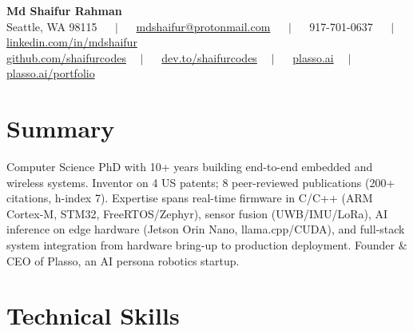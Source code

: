 \documentclass[10.5pt,letterpaper]{article}
\newcommand{\pipe}{$\quad \mid \quad$}
\begin{document}
\begin{center}
  {\LARGE\bfseries Md Shaifur Rahman}\\[4pt]
  Seattle, WA 98115 \pipe{} 
  \href{mailto:mdshaifur@protonmail.com}{mdshaifur@protonmail.com} \pipe{}
  917-701-0637 \pipe{} \href{https://linkedin.com/in/mdshaifur}{linkedin.com/in/mdshaifur}\\[2pt]
  \href{https://github.com/shaifurcodes}{github.com/shaifurcodes}\pipe{} 
  \href{https://dev.to/shaifurcodes}{dev.to/shaifurcodes}\pipe{} 
  \href{https://plasso.ai}{plasso.ai}\pipe{} 
  \href{https://plasso.ai/portfolio}{plasso.ai/portfolio}
\end{center}

\vspace{2pt}

\section{Summary}
Computer Science PhD with 10+ years building end-to-end embedded and wireless systems.
Inventor on 4 US patents; 8 peer-reviewed publications (200+ citations, h-index 7).
Expertise spans real-time firmware in C/C++ (ARM Cortex-M, STM32, FreeRTOS/Zephyr),
sensor fusion (UWB/IMU/LoRa), AI inference on edge hardware (Jetson Orin Nano,
llama.cpp/CUDA), and full-stack system integration from hardware bring-up to production
deployment. Founder \& CEO of Plasso, an AI persona robotics startup.

\section{Technical Skills}
\end{document}
